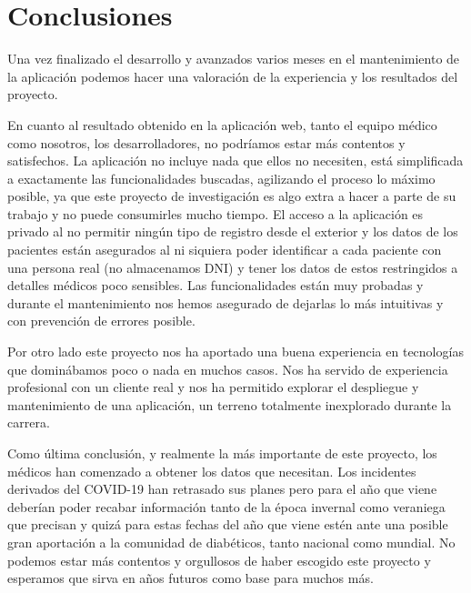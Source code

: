 \chapter{Conclusiones}
    
    Una vez finalizado el desarrollo y avanzados varios meses en el mantenimiento de la aplicación podemos hacer una valoración de la experiencia y los resultados del proyecto.
    \newline
    
    En cuanto al resultado obtenido en la aplicación web, tanto el equipo médico como nosotros, los desarrolladores, no podríamos estar más contentos y satisfechos. La aplicación no incluye nada que ellos no necesiten, está simplificada a exactamente las funcionalidades buscadas, agilizando el proceso lo máximo posible, ya que este proyecto de investigación es algo extra a hacer a parte de su trabajo y no puede consumirles mucho tiempo. El acceso a la aplicación es privado al no permitir ningún tipo de registro desde el exterior y los datos de los pacientes están asegurados al ni siquiera poder identificar a cada paciente con una persona real (no almacenamos DNI) y tener los datos de estos restringidos a detalles médicos poco sensibles. Las funcionalidades están muy probadas y durante el mantenimiento nos hemos asegurado de dejarlas lo más intuitivas y con prevención de errores posible.
    \newline
    
    Por otro lado este proyecto nos ha aportado una buena experiencia en tecnologías que dominábamos poco o nada en muchos casos. Nos ha servido de experiencia profesional con un cliente real y nos ha permitido explorar el despliegue y mantenimiento de una aplicación, un terreno totalmente inexplorado durante la carrera.
    \newline
    
    Como última conclusión, y realmente la más importante de este proyecto, los médicos han comenzado a obtener los datos que necesitan. Los incidentes derivados del COVID-19 han retrasado sus planes pero para el año que viene deberían poder recabar información tanto de la época invernal como veraniega que precisan y quizá para estas fechas del año que viene estén ante una posible gran aportación a la comunidad de diabéticos, tanto nacional como mundial. No podemos estar más contentos y orgullosos de haber escogido este proyecto y esperamos que sirva en años futuros como base para muchos más.